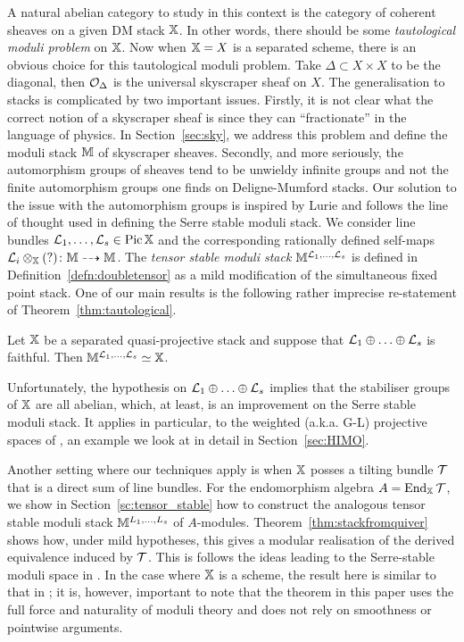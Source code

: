 \documentclass[12pt]{amsart}
\begin{document}
A natural abelian category to study in this context is the category of coherent sheaves on a given DM stack $\mathbb{X}$.
In other words, there should be some {\em tautological moduli problem} on $\mathbb{X}$. 
Now when $\mathbb{X}=X$ is a separated scheme, there is an obvious choice for this tautological moduli problem. 
Take $\Delta \subset X \times X$ to be the diagonal, then $\mathcal{O}_{\Delta}$ is the universal skyscraper sheaf on $X$. 
The generalisation to stacks is complicated by two important issues. 
Firstly, it is not clear what the correct notion of a skyscraper sheaf is since they can ``fractionate'' in the language of physics. 
In Section~\ref{sec:sky}, we address this problem and define the moduli stack $\mathbb{M}$ of skyscraper sheaves.
Secondly, and more seriously, the automorphism groups of sheaves tend to be unwieldy infinite groups and not the finite automorphism groups one finds on Deligne-Mumford stacks. 
Our solution to the issue with the automorphism groups is inspired by Lurie \cite[Theorem 5.11]{Lurie} and follows the line of thought used in defining the Serre stable moduli stack.
We consider line bundles $\mathcal{L}_1,\ldots, \mathcal{L}_s \in \operatorname{Pic} \mathbb{X}$ and the corresponding rationally defined self-maps $\mathcal{L}_i \otimes_{\mathbb{X}} (?) \colon \mathbb{M} \dashrightarrow \mathbb{M}$. 
The {\em tensor stable moduli stack} $\mathbb{M}^{\mathcal{L}_1,\ldots,\mathcal{L}_s}$ is defined in Definition~\ref{defn:doubletensor} as a mild modification of the simultaneous fixed point stack. 
One of our main results is the following rather imprecise re-statement of Theorem~\ref{thm:tautological}.

\begin{theorem}
Let $\mathbb{X}$ be a separated quasi-projective stack and suppose that $\mathcal{L}_1\oplus \ldots \oplus \mathcal{L}_s$ is faithful. Then $\mathbb{M}^{\mathcal{L}_1,\ldots,\mathcal{L}_s} \simeq \mathbb{X}$.
\end{theorem}
Unfortunately, the hypothesis on $\mathcal{L}_1\oplus \ldots \oplus\mathcal{L}_s$ implies that the stabiliser groups of $\mathbb{X}$ are all abelian, which, at least, is an improvement on the Serre stable moduli stack. 
It applies in particular, to the weighted (a.k.a. G-L) projective spaces of \cite{HIMO}, an example we look at in detail in Section~\ref{sec:HIMO}. 

Another setting where our techniques apply is when $\mathbb{X}$ posses a tilting bundle $\mathcal{T}$ that is a direct sum of line bundles.
For the endomorphism algebra $A = \operatorname{End}_{\mathbb{X}} \mathcal{T}$, we show in Section~\ref{sc:tensor_stable} how to construct the analogous tensor stable moduli stack $\mathbb{M}^{L_1,\ldots,L_s}$ of $A$-modules. 
Theorem~\ref{thm:stackfromquiver} shows how, under mild hypotheses, this gives a modular realisation of the derived equivalence induced by $\mathcal{T}$.
This is follows the ideas leading to the Serre-stable moduli space in \cite{CL}.
In the case where $\mathbb{X}$ is a scheme, the result here is similar to that in \cite{MR2421120}; it is, however, important to note that the theorem in this paper uses the full force and naturality of moduli theory and does not rely on smoothness or pointwise arguments.
\end{document}
